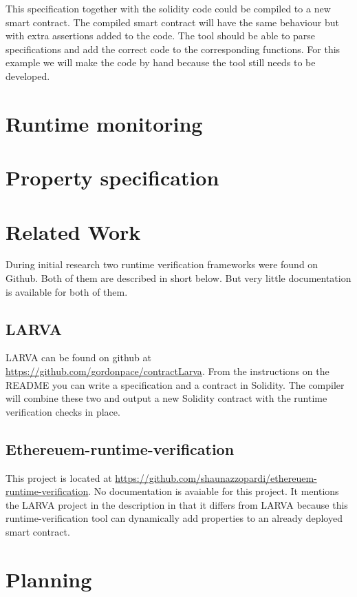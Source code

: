 \documentclass[a4paper]{article}
\begin{document}

 
This specification together with the solidity code could be compiled to a new smart contract. The compiled smart contract will have the same behaviour but with extra assertions added to the code. The tool should be able to parse specifications and add the correct code to the corresponding functions. For this example we will make the code by hand because the tool still needs to be developed.





\section{Runtime monitoring} 


\section{Property specification}


\section{Related Work}
During initial research two runtime verification frameworks were found on Github. Both of them are described in short below. But very little documentation is available for both of them.
\subsection{LARVA}
LARVA can be found on github at \url{https://github.com/gordonpace/contractLarva}. From the instructions on the README you can write a specification and a contract in Solidity. The compiler will combine these two and output a new Solidity contract with the runtime verification checks in place. 

\subsection{Ethereuem-runtime-verification}
This project is located at \url{https://github.com/shaunazzopardi/ethereuem-runtime-verification}. No documentation is avaiable for this project. It mentions the LARVA project in the description in that it differs from LARVA because this runtime-verification tool can dynamically add properties to an already deployed smart contract.



\section{Planning}
\end{document}
